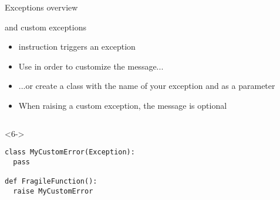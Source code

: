 \begin{frame}[fragile]{Exceptions overview}

   and custom exceptions

  \begin{itemize}
    \item<2->  instruction triggers an exception
    \item<3-> Use  in order to customize the message...
    \item<4-> ...or create a class with the name of your exception and  as a parameter
    \item<5-> When raising a custom exception, the message is optional
  \end{itemize}

  \begin{columns}[onlytextwidth]
    \begin{column}{\textwidth}
      \begin{onlyenv}<6->
        \begin{lstlisting}[style=python,morekeywords={as}]
class MyCustomError(Exception):
  pass

def FragileFunction():
  raise MyCustomError \end{lstlisting}
      \end{onlyenv}
    \end{column}
  \end{columns}

\end{frame}
